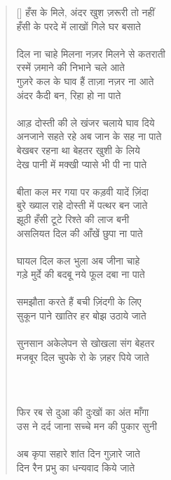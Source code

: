 \begin{verse}[\versewidth]\texthindi{
हँस के मिले, अंदर खुश ज़रूरी तो नहीं\\
हँसी के परदे में लाखों गिले घर बसाते\\
\\
दिल ना चाहे मिलना नज़र मिलने से कतराती\\
रस्में ज़माने की निभाने चले आते\\
गुज़रे कल के घाव हैं ताज़ा नज़र ना आते\\
अंदर कैदी बन, रिहा हो ना पाते\\
\\
आड़ दोस्ती की ले खंजर चलाये घाव दिये\\
अनजाने सहते रहे अब जान के सह ना पाते\\
बेखबर रहना था बेहतर खुशी के लिये\\
देख पानी में मक्खी प्यासे भी पी ना पाते\\
\\
बीता कल मर गया पर कड़वी यादें ज़िंदा\\
बुरे ख्याल राहे दोस्ती में पत्थर बन जाते\\
झूठी हँसी टूटे रिश्ते की लाज बनी\\
असलियत दिल की आँखें छुपा ना पाते\\
\\
घायल दिल कल भुला अब जीना चाहे\\
गड़े मुर्दे की बदबू नये फूल दबा ना पाते\\
\\
समझौता करते हैं बची ज़िंदगी के लिए\\
सुकून पाने खातिर हर बोझ उठाये जाते\\
\\
सुनसान अकेलेपन से खोखला संग बेहतर\\
मजबूर दिल चुपके रो के ज़हर पिये जाते\\
\\
\\
\\
फिर रब से दुआ की दुःखों का अंत माँगा\\
उस ने दर्द जाना सच्चे मन की पुकार सुनी\\
\\
अब कृपा सहारे शांत दिन गुज़ारे जाते\\
दिन रैन प्रभु का धन्यवाद किये जाते
}
\end{verse}

